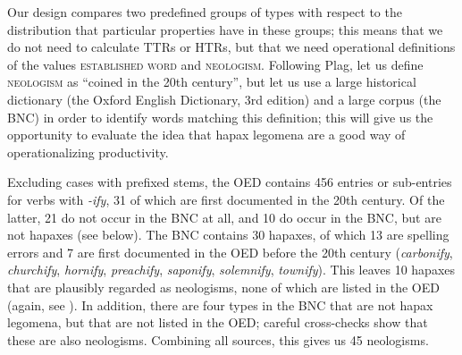 Our design  compares two predefined groups of types  with respect to the distribution  that particular properties have in these groups; this means that we do not need to calculate TTRs  or HTRs,  but that we need operational  definitions of the values \textsc{established word} and \textsc{neologism}.  Following Plag, let us define \textsc{neologism} as ``coined in the 20th century'', but let us use a large historical dictionary  (the Oxford English Dictionary,  3rd edition) and a large  corpus (the BNC)  in order to identify words matching this definition; this will give us the opportunity to evaluate the idea that hapax  legomena are a good way of operationalizing  productivity.

Excluding cases with prefixed  stems,  the OED  contains 456 entries or sub\hyp{}entries for verbs  with \textit{-ify}, 31 of which are first documented in the 20th century. Of the latter, 21 do not occur in the BNC  at all, and 10 do occur in the BNC, but are not hapaxes  (see  below). The BNC contains 30 hapaxes, of which 13 are spelling errors and 7 are first documented in the OED  before the 20th century (\textit{carbonify}, \textit{churchify}, \textit{hornify}, \textit{preachify}, \textit{saponify}, \textit{solemnify}, \textit{townify}). This leaves 10 hapaxes that are plausibly regarded as neologisms,  none of which are listed in the OED  (again, see ). In addition, there are four types  in the BNC  that are not hapax  legomena, but that are not listed in the OED;  careful cross\hyp{}checks show that these are also neologisms. Combining all sources, this gives us 45 neologisms.

